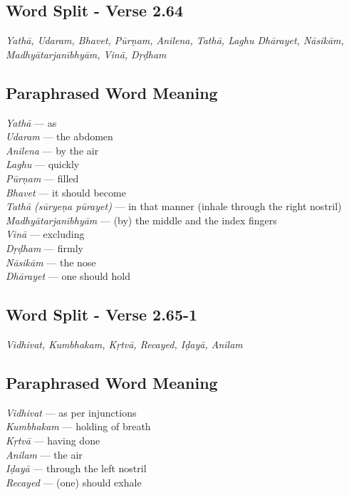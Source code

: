 \subsection*{Word Split - Verse 2.64}

\textit{Yathā, Udaram, Bhavet, Pūrṇam, Anilena, Tathā, Laghu Dhārayet, Nāsikām, Madhyātarjanībhyām, Vinā, Dṛḍham}


\subsection*{Paraphrased Word Meaning}


\begin{multicols}{2}
\textit{Yathā} --- as \\
\textit{Udaram} --- the abdomen \\
\textit{Anilena} --- by the air \\
\textit{Laghu} --- quickly \\
\textit{Pūrṇam} --- filled \\
\textit{Bhavet} --- it should become \\
\textit{Tathā (sūryeṇa pūrayet)} --- in that manner (inhale through the right nostril)\\
\textit{Madhyātarjanībhyām} --- (by) the middle and the index fingers \\
\textit{Vinā}  --- excluding\\
\textit{Dṛḍham} --- firmly\\
\textit{Nāsikām} --- the nose\\
\textit{Dhārayet} --- one should hold
\end{multicols}

\subsection*{Word Split - Verse 2.65-1}

\textit{Vidhivat, Kumbhakam, Kṛtvā, Recayed, Iḍayā, Anilam}
\newpage
\subsection*{Paraphrased Word Meaning}

\begin{multicols}{2}
\textit{Vidhivat} --- as per injunctions\\
\textit{Kumbhakam} --- holding of breath \\
\textit{Kṛtvā} --- having done \\
\textit{Anilam} --- the air \\
\textit{Iḍayā} --- through the left nostril\\
\textit{Recayed} --- (one) should exhale
\end{multicols}

